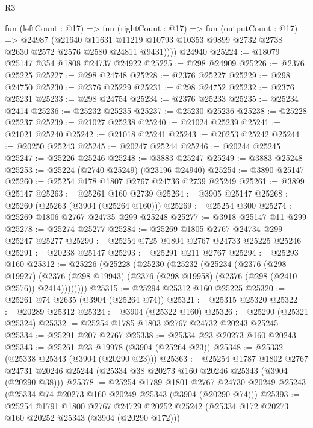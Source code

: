 \begin{lexlean}{R3}
\begin{coremodule}
        fun (leftCount : @17) =>
        fun (rightCount : @17) =>
        fun (outputCount : @17) =>
        @24987
          (@21640
            @11631
            @11219
            @10793
            @10353
            @9899
            @2732
            @2738
            @2630
            @2572
            @2576
            @2580
            @24811
            @9431))))
    @24940
@25224 := @18079 @25147 @354 @1808 @24737 @24922
@25225 := @298 @24909
@25226 := @2376 @25225
@25227 := @298 @24748
@25228 := @2376 @25227
@25229 := @298 @24750
@25230 := @2376 @25229
@25231 := @298 @24752
@25232 := @2376 @25231
@25233 := @298 @24754
@25234 := @2376 @25233
@25235 := @25234 @2414
@25236 := @25232 @25235
@25237 := @25230 @25236
@25238 := @25228 @25237
@25239 := @21027 @25238
@25240 := @21024 @25239
@25241 := @21021 @25240
@25242 := @21018 @25241
@25243 := @20253 @25242
@25244 := @20250 @25243
@25245 := @20247 @25244
@25246 := @20244 @25245
@25247 := @25226 @25246
@25248 := @3883 @25247
@25249 := @3883 @25248
@25253 := @25224 (@2740 @25249) (@23196 @24940)
@25254 := @3890 @25147
@25260 := @25254 @178 @1807 @2767 @24736 @2739 @25249
@25261 := @3899 @25147
@25263 := @25261 @160 @2739
@25264 := @3905 @25147
@25268 := @25260 (@25263 (@3904 (@25264 @160)))
@25269 := @25254 @300
@25274 := @25269 @1806 @2767 @24735 @299 @25248
@25277 := @3918 @25147 @11 @299
@25278 := @25274 @25277
@25284 := @25269 @1805 @2767 @24734 @299 @25247 @25277
@25290 := @25254 @725 @1804 @2767 @24733 @25225 @25246
@25291 := @20238 @25147
@25293 := @25291 @211 @2767
@25294 := @25293 @160
@25312 := @25226
    (@25228
      (@25230
        (@25232
          (@25234
            (@2376
              (@298 @19927)
              (@2376 (@298 @19943) (@2376 (@298 @19958) (@2376 (@298 (@2410 @2576)) @2414))))))))
@25315 := @25294 @25312 @160 @25225
@25320 := @25261 @74 @2635 (@3904 (@25264 @74))
@25321 := @25315 @25320
@25322 := @20289 @25312
@25324 := @3904 (@25322 @160)
@25326 := @25290 (@25321 @25324)
@25332 := @25254 @1785 @1803 @2767 @24732 @20243 @25245
@25334 := @25291 @207 @2767
@25338 := @25334 @23 @20273 @160 @20243
@25343 := @25261 @23 @19978 (@3904 (@25264 @23))
@25348 := @25332 (@25338 @25343 (@3904 (@20290 @23)))
@25363 := @25254
    @1787
    @1802
    @2767
    @24731
    @20246
    @25244
    (@25334 @38 @20273 @160 @20246 @25343 (@3904 (@20290 @38)))
@25378 := @25254
    @1789
    @1801
    @2767
    @24730
    @20249
    @25243
    (@25334 @74 @20273 @160 @20249 @25343 (@3904 (@20290 @74)))
@25393 := @25254
    @1791
    @1800
    @2767
    @24729
    @20252
    @25242
    (@25334 @172 @20273 @160 @20252 @25343 (@3904 (@20290 @172)))

\end{coremodule}
\end{lexlean}
